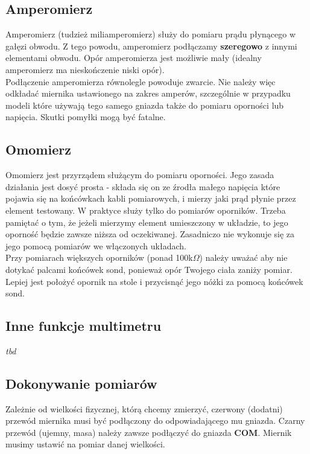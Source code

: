 \documentclass{pdfBooklets}
\begin{document}
\subsection{Amperomierz}
Amperomierz (tudzież miliamperomierz) służy do pomiaru prądu płynącego w gałęzi obwodu. Z tego powodu, amperomierz podłączamy
\textbf{szeregowo} z innymi elementami obwodu. Opór amperomierza jest możliwie mały (idealny amperomierz ma nieskończenie niski opór).
\\

Podłączenie amperomierza równolegle powoduje zwarcie. Nie należy więc odkładać miernika ustawionego na zakres amperów, szczególnie
w przypadku modeli które używają tego samego gniazda także do pomiaru oporności lub napięcia. Skutki pomyłki mogą być fatalne.

\subsection{Omomierz}
Omomierz jest przyrządem służącym do pomiaru oporności. Jego zasada działania jest dosyć prosta - składa się on ze źrodła małego napięcia
które pojawia się na końcówkach kabli pomiarowych, i mierzy jaki prąd płynie przez element testowany. W praktyce służy
tylko do pomiarów oporników. Trzeba pamiętać o tym, że jeżeli mierzymy element umieszczony w układzie, to jego oporność będzie zawsze
niższa od oczekiwanej. Zasadniczo nie wykonuje się za jego pomocą pomiarów we włączonych układach.
\\
Przy pomiarach większych oporników (ponad 100k$\Omega$) należy uważać aby nie dotykać palcami końcówek sond, ponieważ opór Twojego ciała
zaniży pomiar. Lepiej jest położyć opornik na stole i przycisnąć jego nóżki za pomocą końcówek sond.



\subsection{Inne funkcje multimetru}

\textit{tbd}

\subsection{Dokonywanie pomiarów}

Zależnie od wielkości fizycznej, którą chcemy zmierzyć, czerwony (dodatni) przewód miernika musi być podłączony do odpowiadającego
mu gniazda. Czarny przewód (ujemny, masa) należy zawsze podłączyć do gniazda \textbf{COM}. Miernik musimy ustawić na pomiar danej
wielkości.
\\
\end{document}
